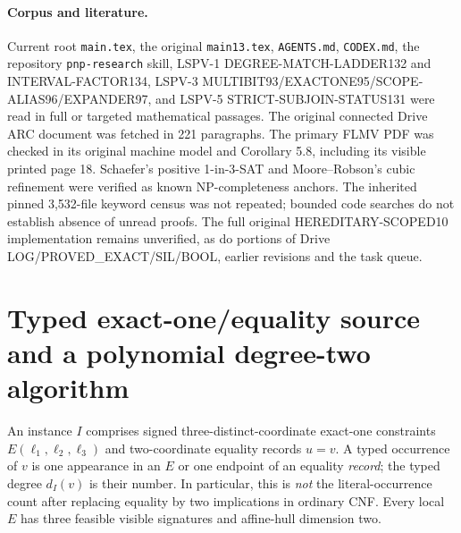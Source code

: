 \documentclass[11pt]{article}
\begin{document}
\paragraph{Corpus and literature.}
Current root \texttt{main.tex}, the original \texttt{main13.tex}, \texttt{AGENTS.md}, \texttt{CODEX.md}, the repository \texttt{pnp-research} skill, LSPV-1 DEGREE-MATCH-LADDER132 and INTERVAL-FACTOR134, LSPV-3 MULTIBIT93/EXACTONE95/SCOPE-ALIAS96/EXPANDER97, and LSPV-5 STRICT-SUBJOIN-STATUS131 were read in full or targeted mathematical passages. The original connected Drive ARC document was fetched in 221 paragraphs. The primary FLMV PDF was checked in its original machine model and Corollary 5.8, including its visible printed page 18. Schaefer's positive 1-in-3-SAT and Moore--Robson's cubic refinement were verified as known NP-completeness anchors. The inherited pinned 3,532-file keyword census was not repeated; bounded code searches do not establish absence of unread proofs. The full original HEREDITARY-SCOPED10 implementation remains unverified, as do portions of Drive LOG/PROVED_EXACT/SIL/BOOL, earlier revisions and the task queue.

\section{Typed exact-one/equality source and a polynomial degree-two algorithm}
An instance $I$ comprises signed three-distinct-coordinate exact-one constraints
$E(\ell_1,\ell_2,\ell_3)$ and two-coordinate equality records $u=v$.
A typed occurrence of $v$ is one appearance in an $E$ or one endpoint
of an equality \emph{record}; the typed degree $d_I(v)$ is their number.
In particular, this is \emph{not} the literal-occurrence count after
replacing equality by two implications in ordinary CNF. Every local
$E$ has three feasible visible signatures and affine-hull dimension two.
\end{document}
